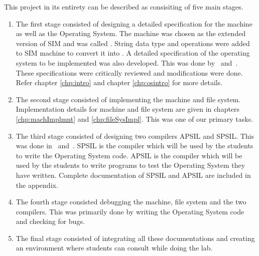 This project in its entirety can be described as consisiting of five main stages.
\begin{enumerate}
	\item The first stage consisted of designing a detailed specification for the machine as well as the Operating System. The machine was chosen as the extended version of SIM and was called \ESIM. String data type and operations were added to SIM machine to convert it into \ESIM. A detailed specification of the operating system to be implemented was also developed. This was done by~\cite{group1} and~\cite{group2}. These specifications were critically reviewed and modifications were done. Refer chapter \ref{chp:intro} and chapter \ref{chp:osintro} for more details.
	
	\item The second stage consisted of implementing the machine and file system. Implementation details for machine and file system are given in chapters \ref{chp:machImplmnt} and \ref{chp:fileSysImpl}. This was one of our primary tasks.
	
	\item The third stage consisted of designing two compilers APSIL and SPSIL. This was done in~\cite{spsil} and~\cite{apsil}. SPSIL is the compiler which will be used by the students to write the Operating System code. APSIL is the compiler which will be used by the students to write programs to test the Operating System they have written. Complete documentation of SPSIL and APSIL are included in the appendix.
	
	\item The fourth stage consisted debugging the machine, file system and the two compilers. This was primarily done by writing the Operating System code and checking for bugs.
	
	\item The final stage consisted of integrating all these documentations and creating an environment where students can consult while doing the lab.
\end{enumerate}

%
